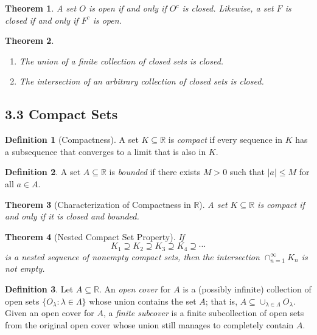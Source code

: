 \documentclass{amsart}
\newtheorem*{theorem}{Theorem}
\theoremstyle{definition}
\newtheorem*{definition}{Definition}
\newcommand{\R}{\mathbb{R}}
\newcommand{\abs}[1]{|#1|}
\newcommand{\st}{\mathrel{:}}
\begin{document}
\begin{theorem}
  A set $O$ is open if and only if $O^c$ is closed. Likewise, a set $F$ is
  closed if and only if $F^c$ is open.
\end{theorem}

\begin{theorem}
  \begin{enumerate}[label={(\roman*)}]
    \item The union of a finite collection of closed sets is closed.
    \item The intersection of an arbitrary collection of closed sets is closed.
  \end{enumerate}
\end{theorem}

\subsection*{3.3 Compact Sets}

\begin{definition}[Compactness]
  A set $K \subseteq \R$ is \emph{compact} if every sequence in $K$ has a
  subsequence that converges to a limit that is also in $K$.
\end{definition}

\begin{definition}
  A set $A \subseteq \R$ is \emph{bounded} if there exists $M > 0$ such that
  $\abs{a} \le M$ for all $a \in A$.
\end{definition}

\begin{theorem}[Characterization of Compactness in $\R$]
  A set $K \subseteq \R$ is compact if and only if it is closed and bounded.
\end{theorem}

\begin{theorem}[Nested Compact Set Property]
  If
  \[
    K_1 \supseteq K_2 \supseteq K_3 \supseteq K_4 \supseteq \cdots
  \]
  is a nested sequence of nonempty compact sets, then the intersection
  $\cap_{n=1}^\infty K_n$ is not empty.
\end{theorem}

\begin{definition}
  Let $A \subseteq \R$. An \emph{open cover} for $A$ is a (possibly infinite)
  collection of open sets $\{O_\lambda \st \lambda \in \Lambda\}$ whose union
  contains the set $A$; that is, $A \subseteq \cup_{\lambda \in \Lambda}
  O_\lambda$. Given an open cover for $A$, a \emph{finite subcover} is a finite
  subcollection of open sets from the original open cover whose union still
  manages to completely contain $A$.
\end{definition}
\end{document}
